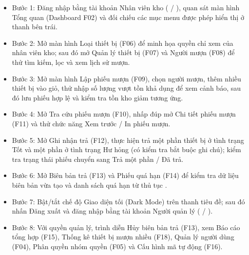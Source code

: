 \begin{itemize}

\item Bước 1: Đăng nhập bằng tài khoản Nhân viên kho ( / ), quan sát màn hình Tổng quan (Dashboard F02) và đối chiếu các mục menu được phép hiển thị ở thanh bên trái.

\item Bước 2: Mở màn hình Loại thiết bị (F06) để minh họa quyền chỉ xem của nhân viên kho; sau đó mở Quản lý thiết bị (F07) và Người mượn (F08) để thử tìm kiếm, lọc và xem lịch sử mượn.

\item Bước 3: Mở màn hình Lập phiếu mượn (F09), chọn người mượn, thêm nhiều thiết bị vào giỏ, thử nhập số lượng vượt tồn khả dụng để xem cảnh báo, sau đó lưu phiếu hợp lệ và kiểm tra tồn kho giảm tương ứng.

\item Bước 4: Mở Tra cứu phiếu mượn (F10), nhấp đúp mở Chi tiết phiếu mượn (F11) và thử chức năng Xem trước / In phiếu mượn.

\item Bước 5: Mở Ghi nhận trả (F12), thực hiện trả một phần thiết bị ở tình trạng Tốt và một phần ở tình trạng Hư hỏng (có kiểm tra bắt buộc ghi chú); kiểm tra trạng thái phiếu chuyển sang Trả một phần / Đã trả.

\item Bước 6: Mở Biên bản trả (F13) và Phiếu quá hạn (F14) để kiểm tra dữ liệu biên bản vừa tạo và danh sách quá hạn từ thủ tục .

\item Bước 7: Bật/tắt chế độ Giao diện tối (Dark Mode) trên thanh tiêu đề; sau đó nhấn Đăng xuất và đăng nhập bằng tài khoản Người quản lý ( / ).

\item Bước 8: Với quyền quản lý, trình diễn Hủy biên bản trả (F13), xem Báo cáo tổng hợp (F15), Thống kê thiết bị mượn nhiều (F18), Quản lý người dùng (F04), Phân quyền nhóm quyền (F05) và Cấu hình mã tự động (F16).

\end{itemize}
